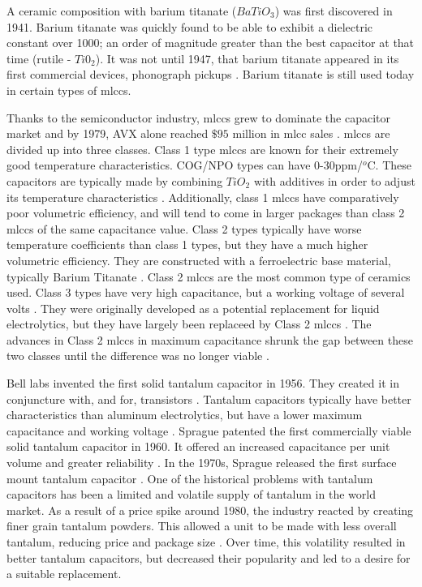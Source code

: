 A ceramic composition with barium titanate ($BaTiO_3$) was first discovered in 1941. Barium titanate was quickly found to be able to exhibit a dielectric constant over 1000; an order of magnitude greater than the best capacitor at that time (rutile - $Ti0_2$). It was not until 1947, that barium titanate appeared in its first commercial devices, phonograph pickups \cite{piezCer}\cite{hist_cerFilt}\cite[Ch 3 Sec III]{cerMaterials}. Barium titanate is still used today in certain types of \glspl{mlcc}.

Thanks to the semiconductor industry, \glspl{mlcc} grew to dominate the capacitor market and by 1979, AVX alone reached $\$95$ million in \gls{mlcc} sales \cite{avx_hist}.
\glspl{mlcc} are divided up into three classes. Class 1 type \glspl{mlcc} are known for their extremely good temperature characteristics. COG/NPO types can have 0-30ppm/$^o$C. These capacitors are typically made by combining $TiO_2$ with additives in order to adjust its temperature characteristics \cite{intro_cerCaps}. Additionally, class 1 \glspl{mlcc} have comparatively poor volumetric efficiency, and will tend to come in larger packages than class 2 \glspl{mlcc} of the same capacitance value. Class 2 types typically have worse temperature coefficients than class 1 types, but they have a much higher volumetric efficiency. They are constructed with a ferroelectric base material, typically Barium Titanate \cite{intro_cerCaps}. Class 2 \glspl{mlcc} are the most common type of ceramics used. Class 3 types have very high capacitance, but a working voltage of several volts \cite{hist_cerFilt}\cite[Ch 3 Sec VI]{cerMaterials}\cite{atCer_tempco}. They were originally developed as a potential replacement for liquid electrolytics, but they have largely been replaceed by Class 2 \glspl{mlcc} \cite{wiki_cer}. The advances in Class 2 \glspl{mlcc} in maximum capacitance shrunk the gap between these two classes until the difference was no longer viable \cite{wiki_cer}.

Bell labs invented the first solid tantalum capacitor in 1956. They created it in conjuncture with, and for, transistors \cite[f.~56-64]{dumInv}. Tantalum capacitors typically have better characteristics than aluminum electrolytics, but have a lower maximum capacitance and working voltage \cite{learn_caps}.
Sprague patented the first commercially viable solid tantalum capacitor in 1960. It offered an increased capacitance per unit volume and greater reliability \cite{charTant}. In the 1970s, Sprague released the first surface mount tantalum capacitor \cite{spragueHist}.
One of the historical problems with tantalum capacitors has been a limited and volatile supply of tantalum in the world market.
As a result of a price spike around 1980, the industry reacted by creating finer grain tantalum powders. This allowed a unit to be made with less overall tantalum, reducing price and package size \cite[ch~3.1]{tantMis}. Over time, this volatility resulted in better tantalum capacitors, but decreased their popularity and led to a desire for a suitable replacement.

